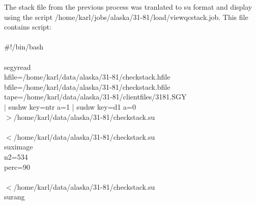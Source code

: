 The stack file from the previous process was tranlated to su format and display using the script /home/karl/jobs/alaska/31-81/load/viewqcstack.job.  This file contains script: \\
\\
\#!/bin/bash \\
 \\
segyread \ \\
	 hfile=/home/karl/data/alaska/31-81/checkstack.hfile \ \\
	 bfile=/home/karl/data/alaska/31-81/checkstack.bfile \ \\
	 tape=/home/karl/data/alaska/31-81/clientfiles/3181.SGY \ \\
$|$ sushw key=ntr a=1 | sushw key=d1 a=0  \ \\
$>$/home/karl/data/alaska/31-81/checkstack.su \\
 \\
$<$/home/karl/data/alaska/31-81/checkstack.su \ \\
    suximage \ \\
    n2=534 \ \\
	perc=90 \\
 \\
$<$/home/karl/data/alaska/31-81/checkstack.su \ \\
    surang